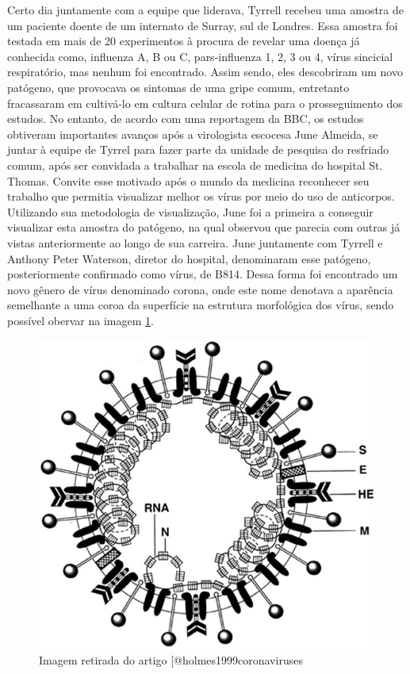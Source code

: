 \documentclass[
  fleqn,ebook]{ic}
\begin{document}
Certo dia juntamente com a equipe que liderava, Tyrrell recebeu uma amostra de
um paciente doente de um internato de Surray, sul de Londres. Essa amostra foi
testada em mais de 20 experimentos à procura de revelar uma doença já conhecida
como, influenza A, B ou C, pars-influenza 1, 2, 3 ou 4, vírus sincicial
respiratório, mas nenhum foi encontrado. Assim sendo, eles descobriram um novo
patógeno, que provocava os sintomas de uma gripe comum, entretanto fracassaram
em cultivá-lo em cultura celular de rotina para o prosseguimento dos estudos.
No entanto, de acordo com uma reportagem da BBC\citep{almeidaBBC}, os estudos
obtiveram importantes avanços após a virologista escocesa June Almeida, se
juntar à equipe de Tyrrel para fazer parte da unidade de pesquisa do resfriado
comum, após ser convidada a trabalhar na escola de medicina do hospital St.~
Thomas. Convite esse motivado após o mundo da medicina reconhecer seu trabalho
que permitia visualizar melhor os vírus por meio do uso de anticorpos.
Utilizando sua metodologia de visualização, June foi a primeira a conseguir
visualizar esta amostra do patógeno, na qual observou que parecia com outras já
vistas anteriormente ao longo de sua carreira. June juntamente com Tyrrell e
Anthony Peter Waterson, diretor do hospital, denominaram esse patógeno,
posteriormente confirmado como vírus, de B814. Dessa forma foi encontrado um
novo gênero de vírus denominado corona, onde este nome denotava a aparência
semelhante a uma coroa da superfície na estrutura morfológica dos vírus, sendo
possível obervar na imagem \ref{fig:coroa}.

\begin{figure}

{\centering \includegraphics[width=0.4\linewidth]{img/coroa} 

}

\caption{Imagem retirada do artigo [@holmes1999coronaviruses}\label{fig:coroa}
\end{figure}
\end{document}
